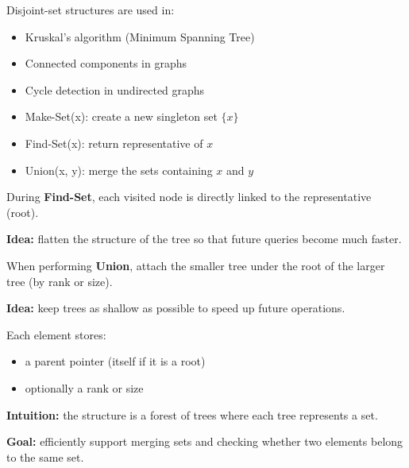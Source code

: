 \documentclass[11pt,a4paper,openany]{book}
\begin{document}
\begin{defnbox}[title=Applications]
Disjoint-set structures are used in:
\begin{itemize}
    \item Kruskal’s algorithm (Minimum Spanning Tree)
    \item Connected components in graphs
    \item Cycle detection in undirected graphs
\end{itemize}
\end{defnbox}

\begin{defnbox}[title=Operations Summary]
\begin{itemize}
    \item Make-Set(x): create a new singleton set $\{x\}$
    \item Find-Set(x): return representative of $x$
    \item Union(x, y): merge the sets containing $x$ and $y$
\end{itemize}
\end{defnbox}



\begin{defnbox}[title=Path Compression]
During \textbf{Find-Set}, each visited node is directly linked to the representative (root).

\textbf{Idea:} flatten the structure of the tree so that future queries become much faster.
\end{defnbox}

\begin{defnbox}[title=Union by Rank / Size]
When performing \textbf{Union}, attach the smaller tree under the root of the larger tree (by rank or size).

\textbf{Idea:} keep trees as shallow as possible to speed up future operations.
\end{defnbox}


\begin{defnbox}[title=Representation + Intuition]
Each element stores:
\begin{itemize}
    \item a parent pointer (itself if it is a root)
    \item optionally a rank or size
\end{itemize}

\textbf{Intuition:} the structure is a forest of trees where each tree represents a set.

\textbf{Goal:} efficiently support merging sets and checking whether two elements belong to the same set.
\end{defnbox}
\end{document}
